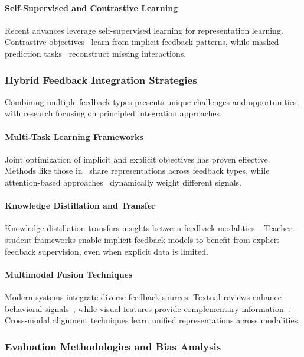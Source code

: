 \paragraph{Self-Supervised and Contrastive Learning}
Recent advances leverage self-supervised learning for representation learning. Contrastive objectives~\cite{yao2021self, xie2022contrastive} learn from implicit feedback patterns, while masked prediction tasks~\cite{hou2022towards} reconstruct missing interactions.

\subsubsection{Hybrid Feedback Integration Strategies}

Combining multiple feedback types presents unique challenges and opportunities, with research focusing on principled integration approaches.

\paragraph{Multi-Task Learning Frameworks}
Joint optimization of implicit and explicit objectives has proven effective. Methods like those in~\cite{ma2011learning, zhao2015improving} share representations across feedback types, while attention-based approaches~\cite{chen2017attentive, liu2018stamp} dynamically weight different signals.

\paragraph{Knowledge Distillation and Transfer}
Knowledge distillation transfers insights between feedback modalities~\cite{zhang2020knowledge}. Teacher-student frameworks enable implicit feedback models to benefit from explicit feedback supervision, even when explicit data is limited.

\paragraph{Multimodal Fusion Techniques}
Modern systems integrate diverse feedback sources. Textual reviews enhance behavioral signals~\cite{liu2022multimodal}, while visual features provide complementary information~\cite{wei2021contrastive}. Cross-modal alignment techniques learn unified representations across modalities.

\subsubsection{Evaluation Methodologies and Bias Analysis}

